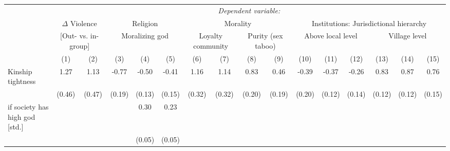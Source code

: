 {\begin{tabular}{l*{15}{c}}\toprule\toprule&\multicolumn{15}{c}{\textit{Dependent variable:}}\\[.1cm] &\multicolumn{2}{c}{$\Delta$ Violence}&\multicolumn{3}{c}{Religion}& \multicolumn{4}{c}{Morality}&   \multicolumn{6}{c}{Institutions: Jurisdictional hierarchy}  \\\cmidrule(lr){4-6}\cmidrule(lr){7-10}\cmidrule(lr){11-16} & \multicolumn{2}{c}{[Out- vs. in-group]} &\multicolumn{3}{c}{Moralizing god}  &\multicolumn{2}{c}{Loyalty community} &\multicolumn{2}{c}{Purity (sex taboo)} &\multicolumn{3}{c}{Above local level} &\multicolumn{3}{c}{Village level}\\\cmidrule(lr){2-3}\cmidrule(lr){4-6}\cmidrule(lr){7-8}\cmidrule(lr){9-10}\cmidrule(lr){11-13}\cmidrule(lr){14-16}
                &\multicolumn{1}{c}{(1)}         &\multicolumn{1}{c}{(2)}         &\multicolumn{1}{c}{(3)}         &\multicolumn{1}{c}{(4)}         &\multicolumn{1}{c}{(5)}         &\multicolumn{1}{c}{(6)}         &\multicolumn{1}{c}{(7)}         &\multicolumn{1}{c}{(8)}         &\multicolumn{1}{c}{(9)}         &\multicolumn{1}{c}{(10)}         &\multicolumn{1}{c}{(11)}         &\multicolumn{1}{c}{(12)}         &\multicolumn{1}{c}{(13)}         &\multicolumn{1}{c}{(14)}         &\multicolumn{1}{c}{(15)}         \\
\midrule
Kinship tightness&     1.27\sym{***}&     1.13\sym{**} &    -0.77\sym{***}&    -0.50\sym{***}&    -0.41\sym{***}&     1.16\sym{***}&     1.14\sym{***}&     0.83\sym{***}&     0.46\sym{**} &    -0.39\sym{*}  &    -0.37\sym{***}&    -0.26\sym{*}  &     0.83\sym{***}&     0.87\sym{***}&     0.76\sym{***}\\
                &   (0.46)         &   (0.47)         &   (0.19)         &   (0.13)         &   (0.15)         &   (0.32)         &   (0.32)         &   (0.20)         &   (0.19)         &   (0.20)         &   (0.12)         &   (0.14)         &   (0.12)         &   (0.12)         &   (0.15)         \\
\addlinespace
1 if society has high god [std.]&                  &                  &                  &     0.30\sym{***}&     0.23\sym{***}&                  &                  &                  &                  &                  &                  &                  &                  &                  &                  \\
                &                  &                  &                  &   (0.05)         &   (0.05)         &                  &                  &                  &                  &                  &                  &                  &                  &                  &                  \\

\end{tabular}}
